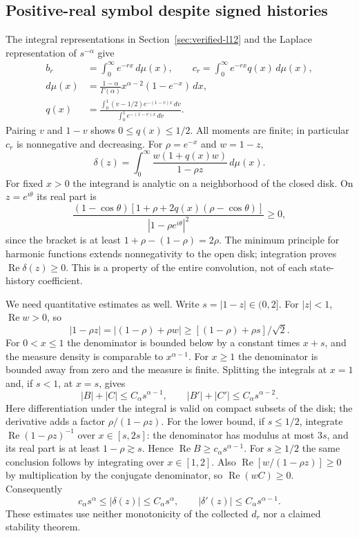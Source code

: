 \documentclass[11pt,a4paper]{amsart}
\theoremstyle{remark}
\theoremstyle{plain}
\theoremstyle{remark}
\numberwithin{equation}{section}
\begin{document}
\subsection{Positive-real symbol despite signed histories}
The integral representations in Section~\ref{sec:verified-l12} and the Laplace representation of $s^{-\alpha}$ give
\begin{align*}
 b_r&=\int_0^\infty e^{-rx}\,d\mu(x),\qquad
 c_r=\int_0^\infty e^{-rx}q(x)\,d\mu(x),\\
 d\mu(x)&=\frac{1-\alpha}{\Gamma(\alpha)}x^{\alpha-2}(1-e^{-x})\,dx,\\
 q(x)&=\frac{\int_0^1(v-1/2)e^{-(1-v)x}\,dv}{\int_0^1e^{-(1-v)x}\,dv}.
\end{align*}
Pairing $v$ and $1-v$ shows $0\le q(x)\le1/2$. All moments are finite; in particular $c_r$ is nonnegative and decreasing. For $\rho=e^{-x}$ and $w=1-z$,
\begin{equation}\label{eq:sp02-symbol}
 \delta(z)=\int_0^\infty\frac{w(1+q(x)w)}{1-\rho z}\,d\mu(x).
\end{equation}
For fixed $x>0$ the integrand is analytic on a neighborhood of the closed disk. On $z=e^{i\theta}$ its real part is
\begin{equation}\label{eq:sp02-positive}
 \frac{(1-\cos\theta)[1+\rho+2q(x)(\rho-\cos\theta)]}{|1-\rho e^{i\theta}|^2}\ge0,
\end{equation}
since the bracket is at least $1+\rho-(1-\rho)=2\rho$. The minimum principle for harmonic functions extends nonnegativity to the open disk; integration proves $\operatorname{Re}\delta(z)\ge0$. This is a property of the entire convolution, not of each state-history coefficient.

We need quantitative estimates as well. Write $s=|1-z|\in(0,2]$. For $|z|<1$, $\operatorname{Re}w>0$, so
\[
 |1-\rho z|=|(1-\rho)+\rho w|\ge [(1-\rho)+\rho s]/\sqrt2.
\]
For $0<x\le1$ the denominator is bounded below by a constant times $x+s$, and the measure density is comparable to $x^{\alpha-1}$. For $x\ge1$ the denominator is bounded away from zero and the measure is finite. Splitting the integrals at $x=1$ and, if $s<1$, at $x=s$, gives
\[
 |B|+|C|\le C_\alpha s^{\alpha-1},\qquad
 |B'|+|C'|\le C_\alpha s^{\alpha-2}.
\]
Here differentiation under the integral is valid on compact subsets of the disk; the derivative adds a factor $\rho/(1-\rho z)$. For the lower bound, if $s\le1/2$, integrate $\operatorname{Re}(1-\rho z)^{-1}$ over $x\in[s,2s]$: the denominator has modulus at most $3s$, and its real part is at least $1-\rho\gtrsim s$. Hence $\operatorname{Re}B\ge c_\alpha s^{\alpha-1}$. For $s\ge1/2$ the same conclusion follows by integrating over $x\in[1,2]$. Also $\operatorname{Re}[w/(1-\rho z)]\ge0$ by multiplication by the conjugate denominator, so $\operatorname{Re}(wC)\ge0$. Consequently
\begin{equation}\label{eq:sp02-symbol-bounds}
 c_\alpha s^\alpha\le|\delta(z)|\le C_\alpha s^\alpha,\qquad
 |\delta'(z)|\le C_\alpha s^{\alpha-1}.
\end{equation}
These estimates use neither monotonicity of the collected $d_r$ nor a claimed stability theorem.
\end{document}
